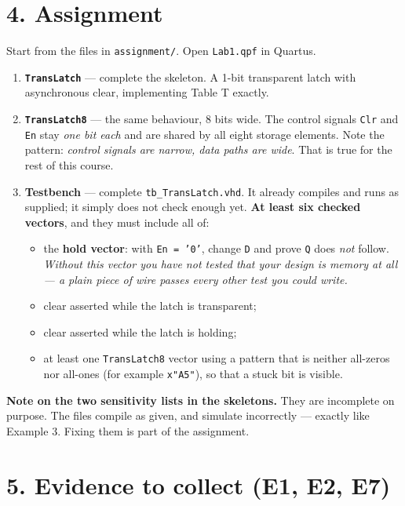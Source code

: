 \documentclass[11pt]{article}
\newcommand{\code}[1]{\texttt{#1}}
\begin{document}
\section*{4. Assignment}

Start from the files in \code{assignment/}. Open \code{Lab1.qpf} in Quartus.

\begin{enumerate}[leftmargin=2em,itemsep=3pt]
\item \textbf{\code{TransLatch}} --- complete the skeleton. A 1-bit transparent
latch with asynchronous clear, implementing Table T exactly.

\item \textbf{\code{TransLatch8}} --- the same behaviour, 8 bits wide. The control
signals \code{Clr} and \code{En} stay \emph{one bit each} and are shared by all
eight storage elements. Note the pattern: \emph{control signals are narrow, data
paths are wide}. That is true for the rest of this course.

\item \textbf{Testbench} --- complete \code{tb\_TransLatch.vhd}. It already
compiles and runs as supplied; it simply does not check enough yet.
\textbf{At least six checked vectors}, and they must include all of:
\begin{itemize}[leftmargin=1.4em,itemsep=1pt]
\item the \textbf{hold vector}: with \code{En\,=\,'0'}, change \code{D} and prove
\code{Q} does \emph{not} follow. \emph{Without this vector you have not tested that
your design is memory at all --- a plain piece of wire passes every other test you
could write.}
\item clear asserted while the latch is transparent;
\item clear asserted while the latch is holding;
\item at least one \code{TransLatch8} vector using a pattern that is neither
all-zeros nor all-ones (for example \code{x"A5"}), so that a stuck bit is visible.
\end{itemize}
\end{enumerate}

\textbf{Note on the two sensitivity lists in the skeletons.} They are incomplete on
purpose. The files compile as given, and simulate incorrectly --- exactly like
Example 3. Fixing them is part of the assignment.

\section*{5. Evidence to collect (E1, E2, E7)}
\end{document}
